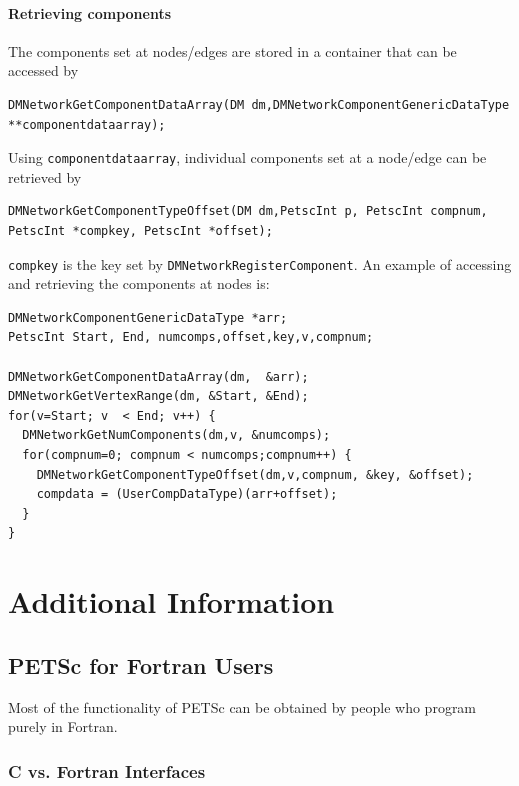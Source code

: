 \subsection{Retrieving components}
The components set at nodes/edges are stored in a container that can be accessed by
\begin{lstlisting}
DMNetworkGetComponentDataArray(DM dm,DMNetworkComponentGenericDataType **componentdataarray);
\end{lstlisting}
  Using \lstinline{componentdataarray}, individual components set at a node/edge can be retrieved by
\begin{lstlisting}
DMNetworkGetComponentTypeOffset(DM dm,PetscInt p, PetscInt compnum, PetscInt *compkey, PetscInt *offset);
\end{lstlisting}
\lstinline{compkey} is the key set by \lstinline{DMNetworkRegisterComponent}. An example of accessing and retrieving the components at nodes is:

\begin{lstlisting}
DMNetworkComponentGenericDataType *arr; 
PetscInt Start, End, numcomps,offset,key,v,compnum; 

DMNetworkGetComponentDataArray(dm,  &arr); 
DMNetworkGetVertexRange(dm, &Start, &End); 
for(v=Start; v  < End; v++) { 
  DMNetworkGetNumComponents(dm,v, &numcomps); 
  for(compnum=0; compnum < numcomps;compnum++) {
    DMNetworkGetComponentTypeOffset(dm,v,compnum, &key, &offset); 
    compdata = (UserCompDataType)(arr+offset); 
  }
}
\end{lstlisting}

\cleardoublepage
\part{Additional Information}
\label{part_usefulstuff}

\cleardoublepage
\chapter{PETSc for Fortran Users}
\label{ch_fortran}

Most of the functionality of PETSc can be obtained by people who
program purely in Fortran.

\section{C vs. Fortran Interfaces}

